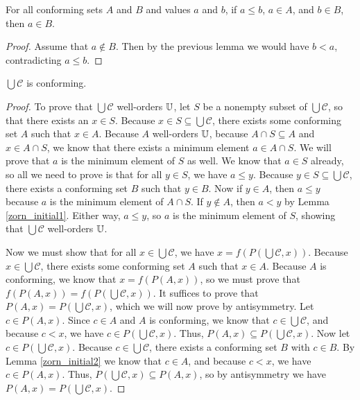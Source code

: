 \documentclass[../math.tex]{subfiles}
\begin{document}
\begin{lemma} \label{zorn_initial2}
    For all conforming sets $A$ and $B$ and values $a$ and $b$, if $a \leq b$,
    $a \in A$, and $b \in B$, then $a \in B$.
\end{lemma}
\begin{proof}
    Assume that $a \notin B$.  Then by the previous lemma we would have $b < a$,
    contradicting $a \leq b$.
\end{proof}

\begin{lemma}
    $\bigcup \mathcal C$ is conforming.
\end{lemma}
\begin{proof}
    To prove that $\bigcup \mathcal C$ well-orders $\mathbb{U}$, let $S$ be a nonempty
    subset of $\bigcup \mathcal C$, so that there exists an $x \in S$.  Because
    $x \in S \subseteq \bigcup \mathcal C$, there exists some conforming set $A$
    such that $x \in A$.  Because $A$ well-orders $\mathbb{U}$, because $A \cap S
    \subseteq A$ and $x \in A \cap S$, we know that there exists a minimum
    element $a \in A \cap S$.  We will prove that $a$ is the minimum element of
    $S$ as well.  We know that $a \in S$ already, so all we need to prove is
    that for all $y \in S$, we have $a \leq y$.  Because $y \in S \subseteq
    \bigcup \mathcal C$, there exists a conforming set $B$ such that $y \in B$.
    Now if $y \in A$, then $a \leq y$ because $a$ is the minimum element of $A
    \cap S$.  If $y \notin A$, then $a < y$ by Lemma \ref{zorn_initial1}.
    Either way, $a \leq y$, so $a$ is the minimum element of $S$, showing that
    $\bigcup \mathcal C$ well-orders $\mathbb{U}$.

    Now we must show that for all $x \in \bigcup \mathcal C$, we have $x =
    f(P(\bigcup \mathcal C, x))$.  Because $x \in \bigcup \mathcal C$, there
    exists some conforming set $A$ such that $x \in A$.  Because $A$ is
    conforming, we know that $x = f(P(A, x))$, so we must prove that $f(P(A, x))
    = f(P(\bigcup \mathcal C, x))$.  It suffices to prove that $P(A, x) =
    P(\bigcup \mathcal C, x)$, which we will now prove by antisymmetry.  Let $c
    \in P(A, x)$.  Since $c \in A$ and $A$ is conforming, we know that $c \in
    \bigcup \mathcal C$, and because $c < x$, we have $c \in P(\bigcup \mathcal
    C, x)$.  Thus, $P(A, x) \subseteq P(\bigcup \mathcal C, x)$.  Now let $c \in
    P(\bigcup \mathcal C, x)$.  Because $c \in \bigcup \mathcal C$, there exists
    a conforming set $B$ with $c \in B$.  By Lemma \ref{zorn_initial2} we know
    that $c \in A$, and because $c < x$, we have $c \in P(A, x)$.  Thus,
    $P(\bigcup \mathcal C, x) \subseteq P(A, x)$, so by antisymmetry we have
    $P(A, x) = P(\bigcup \mathcal C, x)$.
\end{proof}
\end{document}
